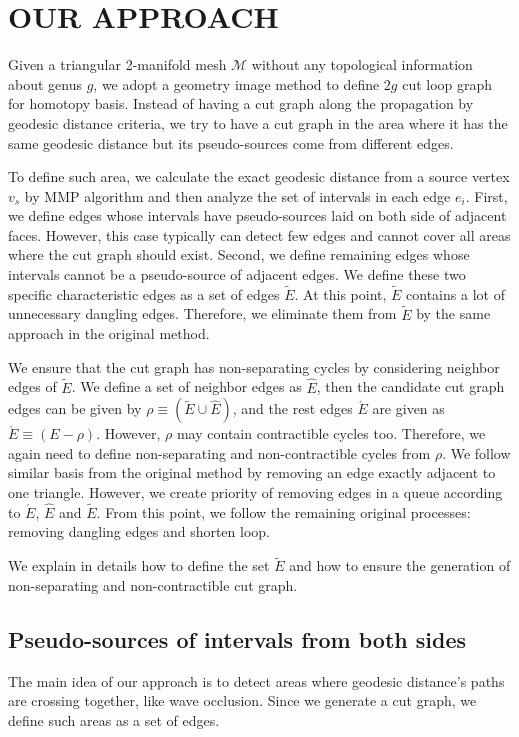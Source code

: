 \documentclass[a4paper,twoside]{article}
\begin{document}
\section{\uppercase{Our Approach}}
\label{sec:our approach}
\noindent Given a triangular 2-manifold mesh $\mathscr{M}$ without any topological information about genus $g$, we adopt a geometry image method \cite{Gu:2002:GI:566654.566589} to define $2g$ cut loop graph for homotopy basis. Instead of having a cut graph along the propagation by geodesic distance criteria, we try to have a cut graph in the area where it has the same geodesic distance but its pseudo-sources come from different edges.

To define such area, we calculate the exact geodesic distance from a source vertex $v_{s}$ by MMP algorithm \cite{Mitchell:1987:DGP:33367.33372} and then  analyze the set of intervals in each edge $e_i$. First, we define edges whose intervals have pseudo-sources laid on both side of adjacent faces. However, this case typically can detect few edges and cannot cover all areas where the cut graph should exist. Second, we define remaining edges whose intervals cannot be a pseudo-source of adjacent edges. We define these two specific characteristic edges as a set of edges $\tilde{E}$. At this point, $\tilde{E}$ contains a lot of unnecessary dangling edges. Therefore, we eliminate them from $\tilde{E}$ by the same approach in the original method.

We ensure that the cut graph has non-separating cycles by considering neighbor edges of $\tilde{E}$. We define a set of neighbor edges as $\hat{E}$, 
then the candidate cut graph edges can be given by $\rho \equiv (\tilde{E} \cup \hat{E})$, and the rest edges $\acute{E}$ are given as $\acute{E} \equiv (E - \rho)$. However, $\rho$ may contain contractible cycles too. Therefore, we again need to define non-separating and non-contractible cycles from $\rho$. We follow similar basis from the original method by removing an edge exactly adjacent to one triangle. However, we create priority of removing edges in a queue according to $\acute{E}$,  $\hat{E}$ and $\tilde{E}$. From this point, we follow the remaining original processes: removing dangling edges and shorten loop.

We explain in details how to define the set $\tilde{E}$ and how to ensure the generation of non-separating and non-contractible cut graph.


\subsection{Pseudo-sources of intervals from both sides}
\label{subsec:pseudo-sources laid on both side of adjacent faces}
The main idea of our approach is to detect areas where geodesic distance's paths are crossing together, like wave occlusion. Since we generate a cut graph, we define such areas as a set of edges.
\end{document}
